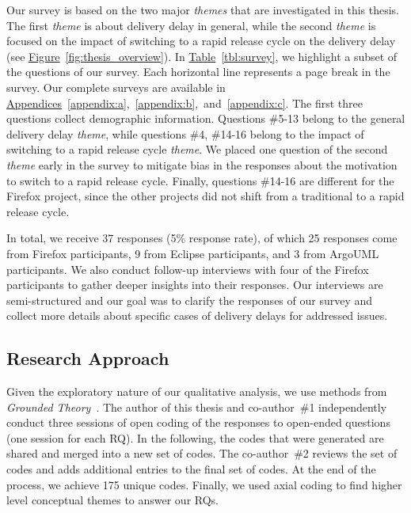 Our survey is based on the two major {\em themes} that are investigated in this
thesis. The first {\em theme} is about
delivery delay in general, while the second {\em theme} is focused on the
impact of switching to a rapid release cycle on the delivery delay (see
\hyperref[fig:thesis_overview]{Figure}~\ref{fig:thesis_overview}). In
\hyperref[tbl:survey]{Table}~\ref{tbl:survey}, we highlight a subset of the
questions of our survey. Each horizontal line represents a page break in the
survey. Our complete surveys are available in
\hyperref[appendix:a]{Appendices}~\ref{appendix:a},~\ref{appendix:b},~and~\ref{appendix:c}.
The first three questions collect demographic information. Questions \#5-13
belong to the general delivery delay {\em theme}, while questions \#4,
\#14-16 belong to the impact of switching to a rapid release cycle {\em theme}.
We placed one question of the second {\em theme} early in the survey to mitigate
bias in the responses about the motivation to switch to a rapid release cycle.
Finally, questions \#14-16 are different for the Firefox project, since the
other projects did not shift from a traditional to a rapid release cycle. 

In total, we receive 37 responses (5\% response rate), of which 25 responses
come from Firefox participants, 9 from Eclipse participants, and 3 from ArgoUML
participants. We also conduct follow-up interviews with four of the Firefox
participants to gather deeper insights into their responses. Our interviews are
semi-structured and our goal was to clarify the responses of our survey and
collect more details about specific cases of delivery delays for addressed
issues.  

\subsection{Research Approach}

Given the exploratory nature of our qualitative analysis, we use methods from
{\em Grounded Theory}~\cite{groundtheorybook}. The author of this thesis and
co-author~\#1 independently conduct three sessions of open coding of the
responses to open-ended questions (one session for each RQ). In the following,
the codes that were generated are shared and merged into a new set of codes. The
co-author~\#2 reviews the set of codes and adds additional entries to the final
set of codes.  At the end of the process, we achieve 175 unique codes. Finally,
we used axial coding to find higher level conceptual themes to answer our RQs.

